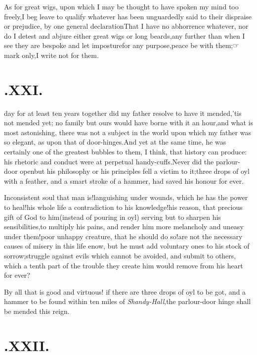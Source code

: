\documentclass{article}
\begin{document}
As for great wigs, upon which I may be thought to have spoken my
mind too freely,\tsh I beg leave to qualify whatever has
been unguardedly said to their dispraise or prejudice, by one
general declaration\tsk That I have no abhorrence whatever,
nor do I detest and abjure either great wigs or long beards,\tsk any
further than when I see they are bespoke and let  imposture\tsk for any
purpose,\tsk peace be with them;\tsk ☞ mark
only,\tsk I write not for them.

\section{.\quad  XXI.}

 day for at least ten years together did my
father resolve to have it mended,\tsh ’tis not mended yet;\tsh\break
no family but ours would have borne with it an hour,\tsk and
what is most asto\-nishing, there was not a subject in the world
upon which my father was so \sic elegant, as upon that of
door-hinges.\tsh\break And yet at the same time, he was certain\-ly one
of the greatest bubbles to them, I think, that history can
produce: his rhe\-toric and conduct were at perpetual
handy-cuffs.\tsk Never did the parlour-door open\tsk but his
philosophy or his principles fell a victim to it;\tsh three
drops of oyl with a feather, and a smart stroke of a hammer, had
saved his honour for ever.

\tsh Inconsistent soul that man is!\tsh languishing under
wounds, which he has the power to heal!\tsk his whole life a
contradiction to his knowledge!\tsk his reason, that precious
gift of God to him\tsk (instead of pouring in oyl) serving but
to sharpen his sensibilities,\tsk to multiply his pains, and
render him more melancholy and uneasy under them!\tsk poor
unhappy creature, that he should do so!\tsh are not the
necessary causes of misery in this life enow, but he must add
voluntary ones to his stock of sorrow;\tsk struggle against
evils which cannot be avoided, and submit to others, which a
tenth part of the trouble they create him would remove from his
heart for ever?

By all that is good and virtuous! if there are three drops of
oyl to be got, and a hammer to be found within ten miles of
\textit{Shandy-Hall},\tsk the parlour-door hinge shall be
mended this reign.

\section{.\quad  XXII.}
\end{document}
